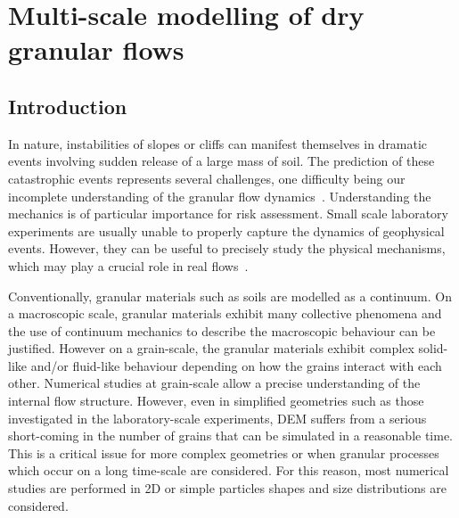 \chapter{Multi-scale modelling of dry granular flows}
\label{chapter:multiscale}

\ifpdf
    \graphicspath{{Chapter4/figs/raster/}{Chapter4/figs/pdf/}{Chapter4/figs/}}
\else
    \graphicspath{{Chapter4/figs/vector/}{Chapter4/figs/}}
\fi

\section{Introduction}

In nature, instabilities of slopes or cliffs can manifest themselves in 
dramatic events involving 
sudden release of a large mass of soil. The prediction of these catastrophic 
events represents several challenges, one difficulty being our incomplete 
understanding of the granular flow dynamics~\citep{Rondon2011}. Understanding 
the mechanics is of particular importance for risk assessment. Small scale 
laboratory experiments are usually unable to properly capture the 
dynamics of geophysical events. However, they can be useful to precisely study 
the physical mechanisms, which may play a crucial role in real 
flows~\citep{Iverson1997}. 

Conventionally, granular materials such as soils are modelled as a continuum. 
On a macroscopic scale, granular materials exhibit many collective phenomena 
and the use of continuum mechanics to describe the macroscopic behaviour can be 
justified. However on a grain-scale, the granular materials exhibit complex 
solid-like and/or fluid-like behaviour depending on how the grains interact 
with each other. Numerical studies at grain-scale allow a precise 
understanding of the internal flow structure. However, even in simplified 
geometries such as those investigated in the laboratory-scale experiments, DEM 
suffers from a serious short-coming in the number of grains that can be 
simulated in a reasonable time. This is a critical issue for more complex 
geometries or when granular processes which occur on a long time-scale are 
considered. For this reason, most numerical studies are 
performed in 2D or simple particles shapes and size distributions are 
considered. 

